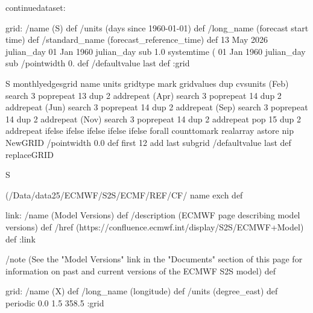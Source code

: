 \begin{ingrid}
continuedataset:

grid:
/name (S) def
/units (days since 1960-01-01) def
/long_name (forecast start time) def
/standard_name (forecast_reference_time) def
13 May 2026 julian_day 01 Jan 1960 julian_day sub
1.0
systemtime
(%
01 Jan 1960 julian_day sub
/pointwidth 0. def
/defaultvalue { last } def
:grid

S monthlyedgesgrid
   name units gridtype mark gridvalues
        {dup cvsunits (Feb) search {3 {pop}repeat 13 {dup 2 add}repeat}{ 
         (Apr) search {3 {pop}repeat 14 {dup 2 add}repeat} { 
            (Jun) search {3 {pop}repeat 14 {dup 2 add}repeat} { 
               (Sep) search {3 {pop}repeat 14 {dup 2 add}repeat} { 
                  (Nov) search {3 {pop}repeat 14 {dup 2 add}repeat} 
                     {pop 15 {dup 2 add}repeat}
                     ifelse}
                  ifelse}
               ifelse}
            ifelse}
         ifelse
         }forall counttomark realarray astore
        nip NewGRID
    /pointwidth 0.0 def
    first 12 add last subgrid
    /defaultvalue { last } def
    replaceGRID


S {(/Data/data25/ECMWF/S2S/ECMF/REF/CF/%
name exch def



link:
 /name (Model Versions) def
 /description (ECMWF page describing model versions) def
 /href (https://confluence.ecmwf.int/display/S2S/ECMWF+Model) def
:link

/note (See the "Model Versions" link in the "Documents" section of this page for information on past and current versions of the ECMWF S2S model) def

grid:
/name (X) def
/long_name (longitude) def
/units (degree_east) def
periodic
0.0 1.5 358.5
:grid

}
\end{ingrid}
